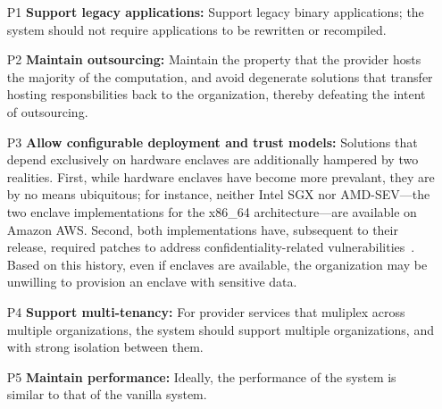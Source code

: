 \begin{enumerate}
    \item[P1] \textbf{Support legacy applications:} 
        Support legacy binary applications; the system should not require
        applications to be rewritten or recompiled.

    \item[P2] \textbf{Maintain outsourcing:}
        Maintain the property that the provider hosts the majority of the computation,
        and avoid degenerate solutions that transfer hosting responsbilities
        back to the organization, thereby defeating the intent of
        outsourcing.

    \item[P3] \textbf{Allow configurable deployment and trust models:}
        Solutions that depend exclusively on hardware enclaves are additionally
        hampered by two realities.
        First, while hardware enclaves have become more prevalant, they are by no means
        ubiquitous; for instance, neither Intel SGX nor AMD-SEV---the two enclave
        implementations for the x86\_64 architecture---are available on Amazon AWS\@.
        Second, both implementations have, subsequent to their release, required
        patches to address confidentiality-related vulnerabilities~\cite{foreshadow,
        amd-sev-unprotected-io, severed}.
        Based on this history, even if enclaves are available, the organization may be
        unwilling to provision an enclave with sensitive data.

    \item[P4] \textbf{Support multi-tenancy:} 
        For provider services that muliplex
        across multiple organizations, the system should support multiple
        organizations, and with strong isolation between them.

    \item[P5] \textbf{Maintain performance:}
        Ideally, the performance of the system is similar to that of the vanilla
        system.
\end{enumerate}
